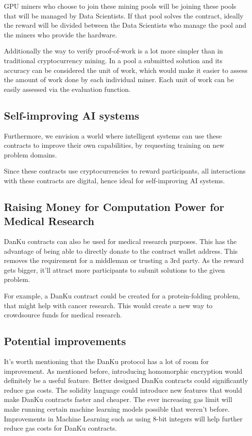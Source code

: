 \documentclass{article}
\begin{document}
GPU miners who choose to join these mining pools will be joining these pools that will be managed by Data Scientists. If that pool solves the contract, ideally the reward will be divided between the Data Scientists who manage the pool and the miners who provide the hardware.

Additionally the way to verify proof-of-work is a lot more simpler than in traditional cryptocurrency mining. In a pool a submitted solution and its accuracy can be considered the unit of work, which would make it easier to assess the amount of work done by each individual miner. Each unit of work can be easily assessed via the evaluation function.

\subsection{Self-improving AI systems}

Furthermore, we envision a world where intelligent systems can use these contracts to improve their own capabilities, by requesting training on new problem domains.

Since these contracts use cryptocurrencies to reward participants, all interactions with these contracts are digital, hence ideal for self-improving AI systems.

\subsection{Raising Money for Computation Power for Medical Research}

DanKu contracts can also be used for medical research purposes. This has the advantage of being able to directly donate to the contract wallet address. This removes the requirement for a middleman or trusting a 3rd party. As the reward gets bigger, it’ll attract more participants to submit solutions to the given problem.

For example, a DanKu contract could be created for a protein-folding problem, that might help with cancer research. This would create a new way to crowdsource funds for medical research.

\subsection{Potential improvements}

It’s worth mentioning that the DanKu protocol has a lot of room for improvement. As mentioned before, introducing homomorphic encryption would definitely be a useful feature. Better designed DanKu contracts could significantly reduce gas costs. \cite{solidity_optimization_paper} The solidity language could introduce new features that would make DanKu contracts faster and cheaper. The ever increasing gas limit will make running certain machine learning models possible that weren’t before. Improvements in Machine Learning such as using 8-bit integers will help further reduce gas costs for DanKu contracts. \cite{tpu_paper}
\end{document}
